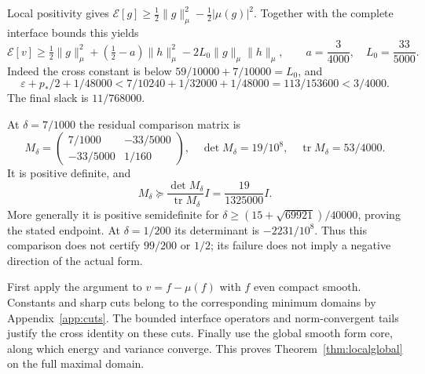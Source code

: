 \documentclass[11pt,a4paper]{article}
\numberwithin{equation}{section}
\theoremstyle{remark}\newtheorem{remark}[theorem]{Remark}
\newcommand{\E}{\mathcal E}\newcommand{\D}{\mathcal D}
\newcommand{\norm}[1]{\lVert#1\rVert}\newcommand{\abs}[1]{\lvert#1\rvert}
\begin{document}
Local positivity gives
$\E[g]\ge\frac12\norm g_\mu^2-\frac12|\mu(g)|^2$.
Together with the complete interface bounds this yields
\begin{equation}\label{eq:twobytwo}
 \E[v]\ge\tfrac12\norm g_\mu^2+(\tfrac12-a)\norm h_\mu^2
 -2L_0\norm g_\mu\norm h_\mu,\qquad
 a=\frac3{4000},\quad L_0=\frac{33}{5000}.
\end{equation}
Indeed the cross constant is below $59/10000+7/10000=L_0$, and
\[
 \varepsilon+p_*/2+1/48000
 <7/10240+1/32000+1/48000=113/153600<3/4000.
\]
The final slack is $11/768000$.

At $\delta=7/1000$ the residual comparison matrix is
\[
 M_\delta=\begin{pmatrix}7/1000&-33/5000\\-33/5000&1/160\end{pmatrix},
 \quad \det M_\delta=19/10^8,\quad
 \operatorname{tr}M_\delta=53/4000.
\]
It is positive definite, and
\begin{equation}\label{eq:margin}
 M_\delta\succeq\frac{\det M_\delta}{\operatorname{tr}M_\delta}I
 =\frac{19}{1325000}I.
\end{equation}
More generally it is positive semidefinite for
$\delta\ge(15+\sqrt{69921})/40000$, proving the stated endpoint.
At $\delta=1/200$ its determinant is $-2231/10^8$.
Thus this comparison does not certify $99/200$ or $1/2$; its failure does not imply a negative direction of the actual form.

First apply the argument to $v=f-\mu(f)$ with $f$ even compact smooth.
Constants and sharp cuts belong to the corresponding minimum domains by Appendix~\ref{app:cuts}.
The bounded interface operators and norm-convergent tails justify the cross identity on these cuts.
Finally use the global smooth form core, along which energy and variance converge.
This proves Theorem~\ref{thm:localglobal} on the full maximal domain.
\end{document}
